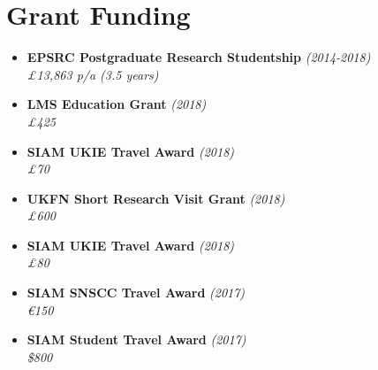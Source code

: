 \documentclass[10pt,a4paper,sans]{moderncv}        %
\begin{document}
	\section{Grant Funding}
		
		\vspace{6pt}
		
		\begin{itemize}
			
			\item \textbf{EPSRC Postgraduate Research Studentship} \hfill \textit{(2014-2018)} \\
			\textit{£13,863 p/a (3.5 years)}
			
			\vspace{2pt}
			
			\item \textbf{LMS Education Grant} \hfill\textit{(2018)}\\
			\textit{£425}
			
			\vspace{2pt}
			
			\item \textbf{SIAM UKIE Travel Award} \hfill\textit{(2018)}\\
			\textit{£70}
			
			\vspace{2pt}
			
			\item \textbf{UKFN Short Research Visit Grant} \hfill\textit{(2018)}\\
			\textit{£600}
			
			\vspace{2pt}
			
			\item \textbf{SIAM UKIE Travel Award} \hfill\textit{(2018)}\\
			\textit{£80}
			
			\vspace{2pt}
			
			\item \textbf{SIAM SNSCC Travel Award} \hfill \textit{(2017)}\\
			\textit{\euro{}150}
			
			\vspace{2pt}
			
			\item \textbf{SIAM Student Travel Award} \hfill\textit{(2017)}\\
			\textit{\$800}
			
			\vspace{2pt}
			

\end{itemize}
\end{document}
